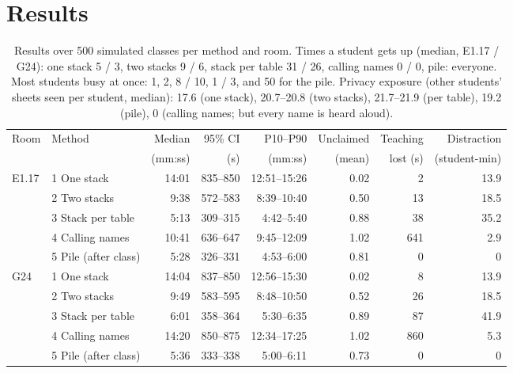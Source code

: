 \documentclass[11pt,a4paper]{article}
\begin{document}
\section{Results}\label{sec:results}

\begin{table}[htbp]\centering\small
\begin{tabular}{llrrrrrr}
\toprule
Room & Method & Median & 95\% CI & P10--P90 & Unclaimed & Teaching & Distraction \\
 & & (mm:ss) & (s) & (mm:ss) & (mean) & lost (s) & (student-min) \\
\midrule
E1.17 & 1 One stack & 14:01 & 835--850 & 12:51--15:26 & 0.02 & 2 & 13.9 \\
 & 2 Two stacks & 9:38 & 572--583 & 8:39--10:40 & 0.50 & 13 & 18.5 \\
 & 3 Stack per table & 5:13 & 309--315 & 4:42--5:40 & 0.88 & 38 & 35.2 \\
 & 4 Calling names & 10:41 & 636--647 & 9:45--12:09 & 1.02 & 641 & 2.9 \\
 & 5 Pile (after class) & 5:28 & 326--331 & 4:53--6:00 & 0.81 & 0 & 0 \\
\midrule
G24 & 1 One stack & 14:04 & 837--850 & 12:56--15:30 & 0.02 & 8 & 13.9 \\
 & 2 Two stacks & 9:49 & 583--595 & 8:48--10:50 & 0.52 & 26 & 18.5 \\
 & 3 Stack per table & 6:01 & 358--364 & 5:30--6:35 & 0.89 & 87 & 41.9 \\
 & 4 Calling names & 14:20 & 850--875 & 12:34--17:25 & 1.02 & 860 & 5.3 \\
 & 5 Pile (after class) & 5:36 & 333--338 & 5:00--6:11 & 0.73 & 0 & 0 \\
\bottomrule
\end{tabular}
\caption{Results over 500 simulated classes per method and room. Times a student gets up (median, E1.17 / G24): one stack 5 / 3, two stacks 9 / 6, stack per table 31 / 26, calling names 0 / 0, pile: everyone. Most students busy at once: 1, 2, 8 / 10, 1 / 3, and 50 for the pile. Privacy exposure (other students' sheets seen per student, median): 17.6 (one stack), 20.7--20.8 (two stacks), 21.7--21.9 (per table), 19.2 (pile), 0 (calling names; but every name is heard aloud).}\label{tab:results}
\end{table}
\end{document}
